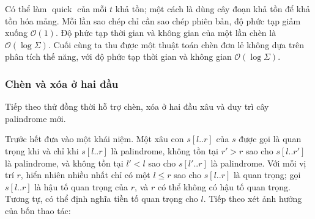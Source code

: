 \documentclass[11pt]{article}
\newcommand{\Oh}{\mathcal{O}}
\begin{document}
Có thể làm \(\operatorname{quick}\) của mỗi \(t\) khả tồn; một cách là dùng
cây đoạn khả tồn để khả tồn hóa mảng. Mỗi lần sao chép chỉ cần sao chép phiên
bản, độ phức tạp giảm xuống \(\Oh(1)\). Độ phức tạp thời gian và không gian
của một lần chèn là \(\Oh(\log \Sigma)\). Cuối cùng ta thu được một thuật toán
chèn đơn lẻ không dựa trên phân tích thế năng, với độ phức tạp thời gian và
không gian \(\Oh(\log \Sigma)\).

\subsubsection{Chèn và xóa ở hai đầu}

Tiếp theo thử đồng thời hỗ trợ chèn, xóa ở hai đầu xâu và duy trì cây
palindrome mới.

Trước hết đưa vào một khái niệm. Một xâu con \(s[l..r]\) của \(s\) được gọi là
quan trọng khi và chỉ khi \(s[l..r]\) là palindrome, không tồn tại
\(r'>r\) sao cho \(s[l..r']\) là palindrome, và không tồn tại \(l'<l\) sao
cho \(s[l'..r]\) là palindrome. Với mỗi vị trí \(r\), hiển nhiên nhiều nhất
chỉ có một \(l\le r\) sao cho \(s[l..r]\) là quan trọng; gọi \(s[l..r]\) là
hậu tố quan trọng của \(r\), và \(r\) có thể không có hậu tố quan trọng. Tương
tự, có thể định nghĩa tiền tố quan trọng cho \(l\). Tiếp theo xét ảnh hưởng
của bốn thao tác:
\end{document}
